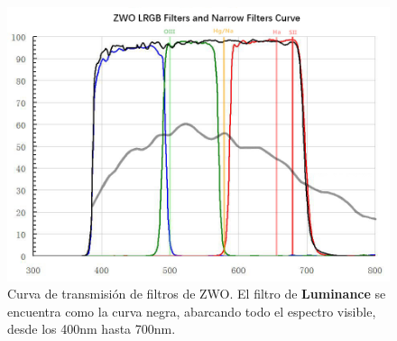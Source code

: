 \begin{figure}[!ht]
	\centering
	\includegraphics[scale=0.59]{Observaciones/Secciones/Figures/ZWO RGBL Transmission Curve.jpg}
	\caption{Curva de transmisión de filtros de ZWO. El filtro de
	\textbf{Luminance} se encuentra como la curva negra, abarcando todo el
	espectro visible, desde los 400nm hasta 700nm.}
	\label{zwoFilterTransmissionCurve}
\end{figure}